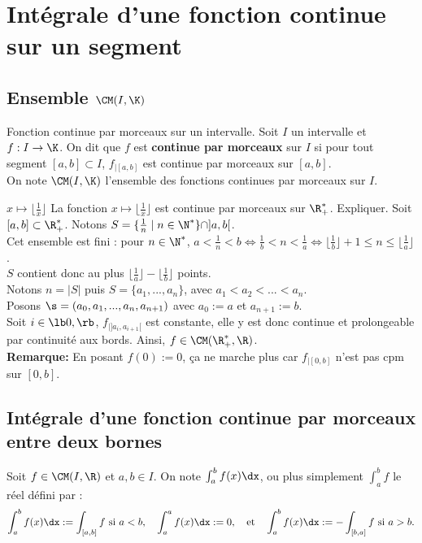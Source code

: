 \documentclass[11pt]{article}
\begin{document}


\section{Intégrale d'une fonction continue sur un segment}
\subsection{Ensemble \texorpdfstring{$\CM(I,\K)$}{Lg}}

\begin{defi}{Fonction continue par morceaux sur un intervalle.}{}
    Soit $I$ un intervalle et $f:I\to\K$. On dit que $f$ est \textbf{continue par morceaux} sur $I$ si pour tout segment $[a,b]\subset I$, $f_{|[a,b]}$ est continue par morceaux sur $[a,b]$.\\
    On note $\CM(I,\K)$ l'ensemble des fonctions continues par morceaux sur $I$.
\end{defi}

\begin{ex}{$x\mapsto\lfloor\frac{1}{x}\rfloor$}{}
La fonction $x\mapsto\lfloor\frac{1}{x}\rfloor$ est continue par morceaux sur $\R^*_+$. Expliquer.
\tcblower
Soit $[a,b]\subset\R^*_+$. Notons $S=\{\frac{1}{n}\mid n\in\N^*\}\cap]a,b[$.\\
Cet ensemble est fini : pour $n\in\N^*$, $a<\frac{1}{n}<b\iff\frac{1}{b}<n<\frac{1}{a}\iff\lfloor\frac{1}{b}\rfloor+1 \leq n \leq \lfloor\frac{1}{a}\rfloor$.\\
$S$ contient donc au plus $\lfloor\frac{1}{a}\rfloor-\lfloor\frac{1}{b}\rfloor$ points.\\
Notons $n=|S|$ puis $S=\{a_1,...,a_n\}$, avec $a_1<a_2<...<a_n$.\\
Posons $\s=(a_0,a_1,...,a_n,a_{n+1})$ avec $a_0 := a$ et $a_{n+1} := b$.\\
Soit $i\in\lb0,\rb$, $f_{|]a_i,a_{i+1}[}$ est constante, elle y est donc continue et prolongeable par continuité aux bords.
Ainsi, $f\in\CM(\R^*_+,\R)$.\\
\textbf{Remarque:} En posant $f(0):=0$, ça ne marche plus car $f_{|[0,b]}$ n'est pas cpm sur $[0,b]$.
\end{ex}

\subsection{Intégrale d'une fonction continue par morceaux entre deux bornes}
\begin{defi}{}{}
    Soit $f\in\CM(I,\R)$ et $a,b\in I$. On note $\int_a^bf(x)\dx$, ou plus simplement $\int_a^bf$ le réel défini par :
    \begin{equation*}
        \int_a^bf(x)\dx:=\int_{[a,b]}f ~ \text{si} ~ a<b, \quad \int_a^af(x)\dx:=0,\quad \text{et}\quad\int_a^bf(x)\dx:=-\int_{[b,a]}f~\text{si } a>b.
    \end{equation*}
\end{defi}
\end{document}
